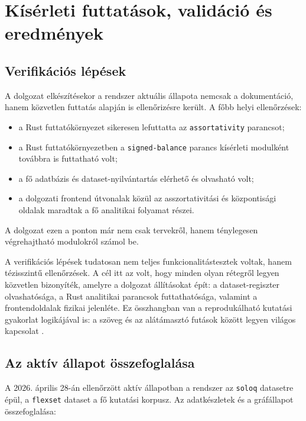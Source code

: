 \chapter{Kísérleti futtatások, validáció és eredmények}

\section{Verifikációs lépések}

A dolgozat elkészítésekor a rendszer aktuális állapota nemcsak a dokumentáció, hanem közvetlen futtatás alapján is ellenőrizésre került. A főbb helyi ellenőrzések:

\begin{itemize}
    \item a Rust futtatókörnyezet sikeresen lefuttatta az \texttt{assortativity} parancsot;
    \item a Rust futtatókörnyezetben a \texttt{signed-balance} parancs kísérleti modulként továbbra is futtatható volt;
    \item a fő adatbázis és dataset-nyilvántartás elérhető és olvasható volt;
    \item a dolgozati frontend útvonalak közül az asszortativitási és központisági oldalak maradtak a fő analitikai folyamat részei.
\end{itemize}

A dolgozat ezen a ponton már nem csak tervekről, hanem ténylegesen végrehajtható modulokról számol be.

A verifikációs lépések tudatosan nem teljes funkcionalitástesztek voltak, hanem tézisszintű ellenőrzések. A cél itt az volt, hogy minden olyan rétegről legyen közvetlen bizonyíték, amelyre a dolgozat állításokat épít: a dataset-regiszter olvashatósága, a Rust analitikai parancsok futtathatósága, valamint a frontendoldalak fizikai jelenléte. Ez összhangban van a reprodukálható kutatási gyakorlat logikájával is: a szöveg és az alátámasztó futások között legyen világos kapcsolat \cite{sandve2013}.

\section{Az aktív állapot összefoglalása}

A 2026. április 28-án ellenőrzött aktív állapotban a rendszer az \texttt{soloq} datasetre épül, a \texttt{flexset} dataset a fő kutatási korpusz. Az adatkészletek és a gráfállapot összefoglalása:

